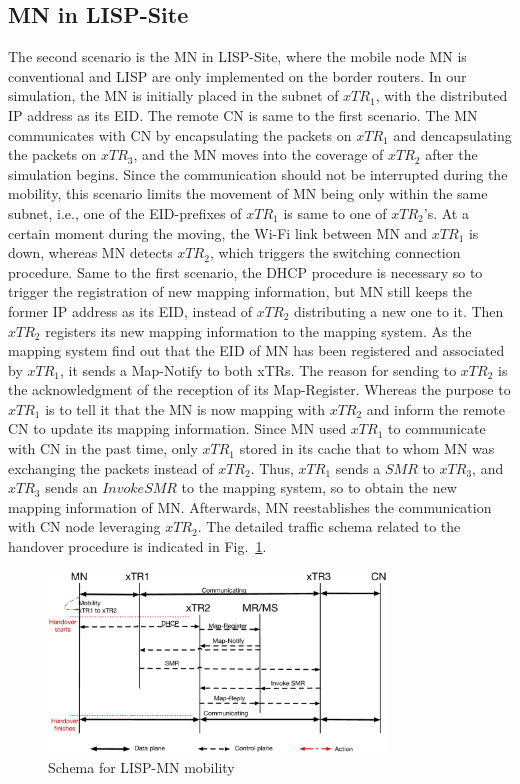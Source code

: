 \subsection{MN in LISP-Site}
\label{sec:ns3_analysis_xTR}
The second scenario is the MN in LISP-Site, where the mobile node MN is conventional and LISP are only implemented on the border routers. In our simulation, the MN is initially placed in the subnet of $xTR_1$, with the distributed IP address as its EID. The remote CN is same to the first scenario. The MN communicates with CN by encapsulating the packets on $xTR_1$ and dencapsulating the packets on $xTR_3$, and the MN moves into the coverage of $xTR_2$ after the simulation begins. Since the communication should not be interrupted during the mobility, this scenario limits the movement of MN being only within the same subnet, i.e., one of the EID-prefixes of $xTR_1$ is same to one of $xTR_2$'s. At a certain moment during the moving, the Wi-Fi link between MN and $xTR_1$ is down, whereas MN detects $xTR_2$, which triggers the switching connection procedure. Same to the first scenario, the DHCP procedure is necessary so to trigger the registration of new mapping information, but MN still keeps the former IP address as its EID, instead of $xTR_2$ distributing a new one to it. Then $xTR_2$ registers its new mapping information to the mapping system. As the mapping system find out that the EID of MN has been registered and associated by $xTR_1$, it sends a Map-Notify to both xTRs. The reason for sending to $xTR_2$ is the acknowledgment of the reception of its Map-Register. Whereas the purpose to $xTR_1$ is to tell it that the MN is now mapping with $xTR_2$ and inform the remote CN to update its mapping information. Since MN used $xTR_1$ to communicate with CN in the past time, only $xTR_1$ stored in its cache that to whom MN was exchanging the packets instead of $xTR_2$. Thus, $xTR_1$ sends a $SMR$ to $xTR_3$, and $xTR_3$ sends an $Invoke SMR$ to the mapping system, so to obtain the new mapping information of MN. Afterwards, MN reestablishes the communication with CN node leveraging $xTR_2$. The detailed traffic schema related to the handover procedure is indicated in Fig.~\ref{sim_schema_xTR}.
\begin{figure}[!th]
	\centering
	\includegraphics[width=0.8\textwidth]{Pics/Mobility_xTR_schema_SMR_simplify}
	\caption{Schema for LISP-MN mobility}
	\label{sim_schema_xTR}
\end{figure}

